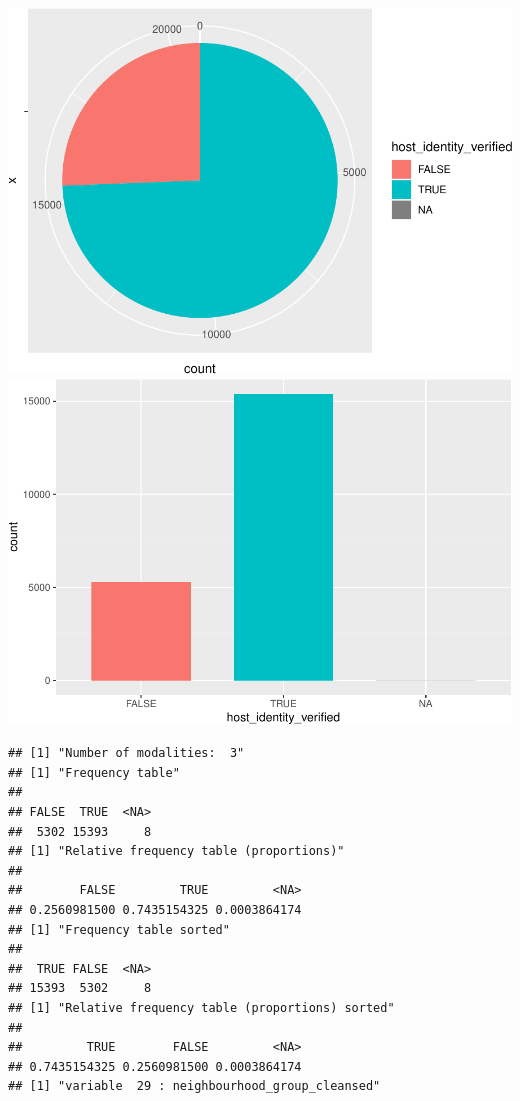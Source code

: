 \includegraphics{anal_files/figure-latex/unnamed-chunk-9-10.pdf}
\includegraphics{anal_files/figure-latex/unnamed-chunk-9-11.pdf}

\begin{verbatim}
## [1] "Number of modalities:  3"
## [1] "Frequency table"
## 
## FALSE  TRUE  <NA> 
##  5302 15393     8 
## [1] "Relative frequency table (proportions)"
## 
##        FALSE         TRUE         <NA> 
## 0.2560981500 0.7435154325 0.0003864174 
## [1] "Frequency table sorted"
## 
##  TRUE FALSE  <NA> 
## 15393  5302     8 
## [1] "Relative frequency table (proportions) sorted"
## 
##         TRUE        FALSE         <NA> 
## 0.7435154325 0.2560981500 0.0003864174 
## [1] "variable  29 : neighbourhood_group_cleansed"
\end{verbatim}

